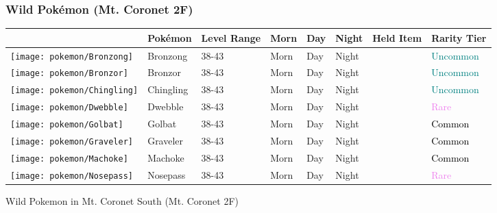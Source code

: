 \subsubsection{Wild Pokémon (Mt. Coronet 2F)}%
\label{ssubsec:WildPokmon(Mt.Coronet2F)}%
\begin{longtable}{||l l l l l l l l||}%
\hline%
&Pokémon&Level Range&Morn&Day&Night&Held Item&Rarity Tier\\%
\hline%
\endhead%
\hline%
\texttt{[image: pokemon/Bronzong]}&Bronzong&38{-}43&Morn&Day&Night&&\textcolor{teal}{%
Uncommon%
}\\%
\hline%
\texttt{[image: pokemon/Bronzor]}&Bronzor&38{-}43&Morn&Day&Night&&\textcolor{teal}{%
Uncommon%
}\\%
\hline%
\texttt{[image: pokemon/Chingling]}&Chingling&38{-}43&Morn&Day&Night&&\textcolor{teal}{%
Uncommon%
}\\%
\hline%
\texttt{[image: pokemon/Dwebble]}&Dwebble&38{-}43&Morn&Day&Night&&\textcolor{violet}{%
Rare%
}\\%
\hline%
\texttt{[image: pokemon/Golbat]}&Golbat&38{-}43&Morn&Day&Night&&\textcolor{black}{%
Common%
}\\%
\hline%
\texttt{[image: pokemon/Graveler]}&Graveler&38{-}43&Morn&Day&Night&&\textcolor{black}{%
Common%
}\\%
\hline%
\texttt{[image: pokemon/Machoke]}&Machoke&38{-}43&Morn&Day&Night&&\textcolor{black}{%
Common%
}\\%
\hline%
\texttt{[image: pokemon/Nosepass]}&Nosepass&38{-}43&Morn&Day&Night&&\textcolor{violet}{%
Rare%
}\\%
\hline%
\end{longtable}%
\caption{Wild Pokemon in Mt. Coronet South (Mt. Coronet 2F)}